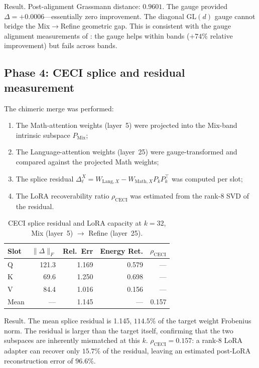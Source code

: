 \documentclass[11pt]{article}
\begin{document}
Result.  Post-alignment Grassmann distance: $0.9601$.
The gauge provided $\Delta{=}{+}0.0006$---essentially zero
improvement.  The diagonal $\mathrm{GL}(d)$ gauge cannot bridge the
Mix$\to$Refine geometric gap.  This is consistent with the gauge
alignment measurements of : the gauge helps
within bands ($+74\%$ relative improvement) but fails across bands.

\subsection{Phase 4: CECI splice and residual measurement}

The chimeric merge was performed:
\begin{enumerate}
\item The Math-attention weights (layer~5) were projected into the
      Mix-band intrinsic subspace $P_{\mathrm{Mix}}$;
\item The Language-attention weights (layer~25) were gauge-transformed
      and compared against the projected Math weights;
\item The splice residual $\Delta_\ell^X = W_{\mathrm{Lang},X} -
      W_{\mathrm{Math},X} P_k P_k^\top$ was computed per slot;
\item The LoRA recoverability ratio $\rho_{\mathrm{CECI}}$ was
      estimated from the rank-8 SVD of the residual.
\end{enumerate}

\begin{table}[h]\centering\small
\caption{CECI splice residual and LoRA capacity at $k{=}32$,
Mix (layer~5) $\to$ Refine (layer~25).}
\label{tab:ceci-splice}
\begin{tabular}{@{}lrrrr@{}}
\toprule
Slot & $\|\Delta\|_F$ & Rel.\ Err & Energy Ret. & $\rho_{\mathrm{CECI}}$ \\
\midrule
Q & 121.3 & 1.169 & 0.579 & --- \\
K & 69.6  & 1.250 & 0.698 & --- \\
V & 84.4  & 1.016 & 0.156 & --- \\
\midrule
Mean & --- & 1.145 & --- & 0.157 \\
\bottomrule
\end{tabular}
\end{table}

Result.  The mean splice residual is 1.145, $114.5\%$
of the target weight Frobenius norm.  The residual is larger than
the target itself, confirming that the two subspaces are inherently
mismatched at this $k$.  $\rho_{\mathrm{CECI}}{=}0.157$: a rank-8 LoRA
adapter can recover only $15.7\%$ of the residual, leaving an estimated
post-LoRA reconstruction error of $96.6\%$.
\end{document}
